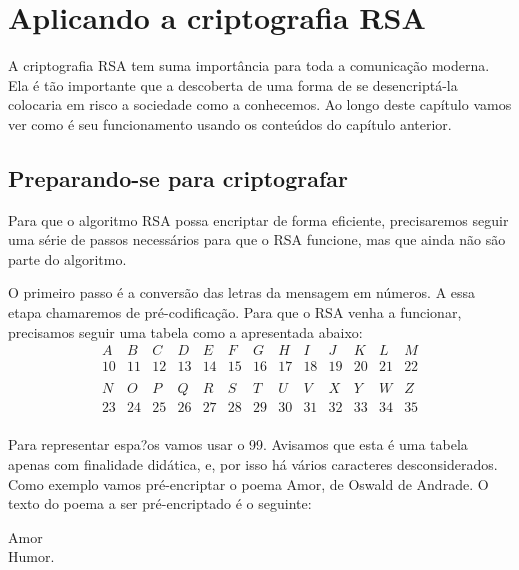 \pagestyle{fancy}
\fancyhead[R]{\thepage}
\fancyfoot[C]{}
\chapter {Aplicando a criptografia RSA}
\label{RSA}

A criptografia RSA tem suma import\^ancia para toda a comunica\c{c}\~ao moderna. Ela \'e t\~ao importante que a descoberta de uma forma de se desencript\'a-la colocaria em risco a sociedade como a conhecemos. Ao longo deste cap\'itulo vamos ver como \'e seu funcionamento usando os conte\'udos do cap\'itulo anterior.

\section{Preparando-se para criptografar}

Para que o algoritmo RSA possa encriptar de forma eficiente, precisaremos seguir uma s\'erie de passos necess\'arios para que o RSA funcione, mas que ainda n\~ao s\~ao parte do algoritmo.

O primeiro passo \'e a convers\~ao das letras da mensagem em n\'umeros. A essa etapa chamaremos de pr\'e-codifica\c{c}\~ao. Para que o RSA venha a funcionar, precisamos seguir uma tabela como a apresentada abaixo:
\[
\begin{array}{ccccccccccccc}
A & B & C & D & E & F & G & H & I & J  &  K  & L  & M  \\ 
10 & 11 & 12 & 13 & 14 & 15 & 16 & 17 & 18 & 19 &  20 & 21 & 22 \\ 
\\
N & O  & P  & Q  & R  & S & T  & U  & V  & X  & Y  & W  & Z \\
23 & 24 & 25 & 26 & 27 & 28 & 29 & 30 & 31 & 32 & 33 & 34 & 35 \\
\end{array}
\]

Para representar espa?os vamos usar o 99. Avisamos que esta \'e uma tabela apenas com finalidade did\'atica, e, por isso h\'a v\'arios caracteres desconsiderados. Como exemplo vamos pr\'e-encriptar o poema Amor, de Oswald de Andrade. O texto do poema a ser pr\'e-encriptado \'e o seguinte:

\begin{center}
Amor  \\ 
Humor. \\ 
\end{center}

